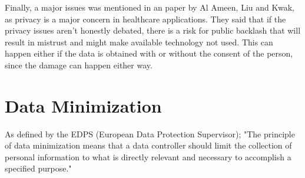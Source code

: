 

Finally, a major issues was mentioned in an paper by Al Ameen, Liu and Kwak\cite{al2012security}, as privacy is a major concern in healthcare applications. They said that if the privacy issues aren't honestly debated, there is a risk for public backlash that will result in mistrust and might make available technology not used. This can happen either if the data is obtained with or without the consent of the person, since the damage can happen either way.




\section{Data Minimization}


As defined by the EDPS (European Data Protection Supervisor); "The principle of data minimization means that a data controller should limit the collection of personal information to what is directly relevant and necessary to accomplish a specified purpose."\cite{websiteEu} %



